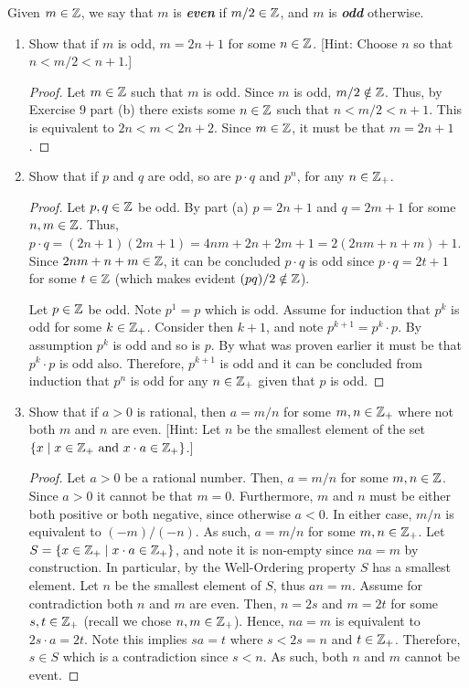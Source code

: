 \documentclass[12pt]{article}
\begin{document}
	 Given $m \in \mathbb{Z}$, we say that $m$ is \textbf{\textbf{\textit{even}}} if $m/2 \in \mathbb{Z}$,
	and $m$ is \textit{\textbf{odd}} otherwise.
	\begin{enumerate}[label=(\alph*)]
		\item Show that if $m$ is odd, $m = 2n + 1$ for some $n \in \mathbb{Z}$. [Hint: Choose $n$ so that 
		$n < m/2 < n + 1$.]
		\begin{proof}
			Let $m \in \mathbb{Z}$ such that $m$ is odd. Since $m$ is odd, $m/2 \notin \mathbb{Z}$. Thus, by Exercise 9 part
			(b) there exists some $n \in \mathbb{Z}$ such that $n < m/2 < n + 1$. This is equivalent to
			$2n < m < 2n + 2$. Since $m \in \mathbb{Z}$, it must be that $m = 2n + 1$.
		\end{proof}
		\item Show that if $p$ and $q$ are odd, so are $p \cdot q$ and $p^n$, for any $n \in \mathbb{Z}_{+}$.
		\begin{proof}			
			Let $p, q \in \mathbb{Z}$ be odd. By part (a) $p = 2n + 1$ and $q = 2m + 1$ for some $n, m \in \mathbb{Z}$.
			Thus, $p \cdot q = (2n + 1)(2m + 1) = 4nm + 2n + 2m + 1 = 2(2nm + n + m) + 1$. Since 
			$2nm + n + m \in \mathbb{Z}$, it can be concluded $p \cdot q$ is odd since $p \cdot q = 2t + 1$ for 
			some $t \in \mathbb{Z}$ (which makes evident $(pq)/2 \notin \mathbb{Z}$).
			
			Let $p \in \mathbb{Z}$ be odd. Note $p^1 = p$ which is odd. Assume for induction that $p^k$ is 
			odd for some $k \in \mathbb{Z}_{+}$. Consider then $k + 1$, and note $p^{k + 1} = p^k \cdot p$.
			By assumption $p^k$ is odd and so is $p$. By what was proven earlier it must be that 
			$p^k \cdot p$ is odd also. Therefore, $p^{k + 1}$ is odd and it can be concluded from induction
			that $p^n$ is odd for any $n \in \mathbb{Z}_{+}$ given that $p$ is odd.
		\end{proof}
		\item Show that if $a > 0$ is rational, then $a = m/n$ for some $m,n \in \mathbb{Z}_{+}$ where not both
		$m$ and $n$ are even. [Hint: Let $n$ be the smallest element of the set 
		$\{x \mid x \in \mathbb{Z}_{+} \text{ and } x\cdot a \in \mathbb{Z}_{+}\}$.]
		\begin{proof}
			Let $a > 0$ be a rational number. Then, $a = m/n$ for some $m, n \in \mathbb{Z}$. Since $a > 0$
			it cannot be that $m = 0$. Furthermore, $m$ and $n$ must be either both positive or both
			negative, since otherwise $a < 0$. In either case, $m/n$ is equivalent to $(-m)/(-n)$.
			As such, $a = m/n$ for some $m,n \in \mathbb{Z}_{+}$. Let $S = \{x \in \mathbb{Z}_{+} \mid x \cdot a \in \mathbb{Z}_{+}\}$,
			and note it is non-empty since $na = m$ by construction. In particular, by the Well-Ordering
			property $S$ has a smallest element. Let $n$ be the smallest element of $S$, thus 
			$an = m$. Assume for contradiction both $n$ and $m$ are even. Then, $n = 2s$ and $m = 2t$
			for some $s, t \in \mathbb{Z}_{+}$ (recall we chose $n, m \in \mathbb{Z}_{+}$). 
			Hence, $na = m$ is equivalent to $2s \cdot a = 2t$. Note this implies $sa = t$ 
			where $s < 2s = n$ and $t \in \mathbb{Z}_{+}$. Therefore, $s \in S$ which is a contradiction 
			since $s < n$. As such, both $n$ and $m$ cannot be event.
			

\end{proof}
\end{enumerate}
\end{document}
